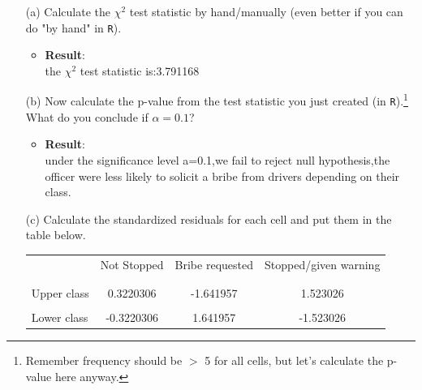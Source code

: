 \documentclass[12pt,letterpaper]{article}
\begin{document}
\begin{enumerate}
	
	\item [(a)]
	Calculate the $\chi^2$ test statistic by hand/manually (even better if you can do "by hand" in \texttt{R}).\\
	
    \begin{itemize}
    \item \textbf{Result}:\\
    the $\chi^2$ test statistic is:3.791168
    \end{itemize}

	
	\item [(b)]
	Now calculate the p-value from the test statistic you just created (in \texttt{R}).\footnote{Remember frequency should be $>$ 5 for all cells, but let's calculate the p-value here anyway.}  What do you conclude if $\alpha = 0.1$?\\
		
	\begin{itemize}
		\item \textbf{Result}:\\
		under the significance level a=0.1,we fail to reject null hypothesis,the officer were less likely to solicit a bribe from drivers depending on their class.
	\end{itemize}
	
	\item [(c)] Calculate the standardized residuals for each cell and put them in the table below.
	\vspace{1cm}
		
	\begin{table}[h]
		\centering
		\begin{tabular}{l | c c c }
			& Not Stopped & Bribe requested & Stopped/given warning \\
			\\[-1.8ex] 
			\hline \\[-1.8ex]
			Upper class  & 0.3220306 &-1.641957 & 1.523026 \\
			\\
			Lower class & -0.3220306 &1.641957  & -1.523026  \\
			
		\end{tabular}
	\end{table}
	

\end{enumerate}
\end{document}
